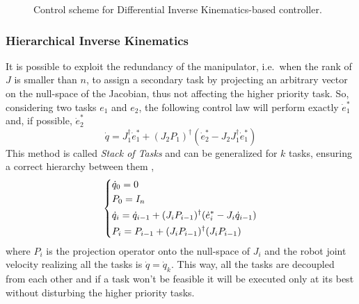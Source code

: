 \begin{figure}[h]
\centering
{}

\caption{Control scheme for Differential Inverse Kinematics-based controller.}
\label{fig:diffinversekinematics}
\end{figure}

\subsubsection{Hierarchical Inverse Kinematics}
It is possible to exploit the redundancy of the manipulator, i.e.\ when the rank of $J$ is smaller than $n$, to assign a secondary task by projecting an arbitrary vector on the null-space of the Jacobian, thus not affecting the higher priority task. So, considering two tasks $e_1$ and $e_2$, the following control law will perform exactly $\dot{e}_1^*$ and, if possible, $\dot{e}_2^*$
\begin{equation}
\dot{q} = J_1^{\dagger}\dot{e}_1^* + (J_{2}P_1)^{\dagger}(\dot{e}_2^* - J_{2}J_1^{\dagger}\dot{e}_1^*)
\end{equation}
This method is called \textit{Stack of Tasks} and can be generalized for $k$ tasks, ensuring a correct hierarchy between them \cite{mansardICAR09},\cite{mansardIEEE09}
\begin{equation}
\begin{dcases}
\dot{q}_0 = 0\\
P_0 = I_n\\
\dot{q}_i = \dot{q}_{i-1} + (J_{i}P_{i-1})^{\dagger}(\dot{e}_i^* - J_{i}\dot{q}_{i-1})\\
P_i = P_{i-1} + (J_{i}P_{i-1})^{\dagger}(J_{i}P_{i-1})
\end{dcases}
\end{equation}
where $P_i$ is the projection operator onto the null-space of $J_i$ and the robot joint velocity realizing all the tasks is $\dot{q}=\dot{q}_k$. This way, all the tasks are decoupled from each other and if a task won't be feasible it will be executed only at its best without disturbing the higher priority tasks.

